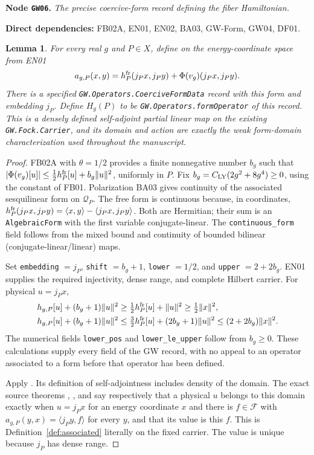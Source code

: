 \documentclass[11pt,a4paper]{article}
\newtheorem{lemma}[theorem]{Lemma}
\theoremstyle{remark}\newtheorem{remark}[theorem]{Remark}
\newcommand{\F}{\mathcal F}\newcommand{\Q}{\mathcal Q}\newcommand{\HH}{\mathcal H}
\newcommand{\node}[3]{\par\Needspace{6\baselineskip}\smallskip\hypertarget{node:#1}{}\label{nodepage:#1}\noindent\textbf{Node \texttt{#1}.} \textit{#2.}\par\noindent\textbf{Direct dependencies:} #3.\par}
\begin{document}
\node{GW06}{The precise coercive-form record defining the fiber Hamiltonian}{FB02A, EN01, EN02, BA03, GW-Form, GW04, DF01}
\begin{lemma}\label{lem:gwformrecord}
For every real $g$ and $P\in X$, define on the energy-coordinate space from EN01
\[
 a_{g,P}(x,y)=h_P^{\rm fr}(j_Px,j_Py)+\Phi(v_g)(j_Px,j_Py).
\]
There is a specified \texttt{GW.Operators.CoerciveFormData} record with this form and embedding $j_P$. Define $H_g(P)$ to be \texttt{GW.Operators.formOperator} of this record. This is a densely defined self-adjoint partial linear map on the existing \texttt{GW.Fock.Carrier}, and its domain and action are exactly the weak form-domain characterization used throughout the manuscript.
\end{lemma}
\begin{proof}
FB02A with $\theta=1/2$ provides a finite nonnegative number $b_g$ such that
$|\Phi(v_g)[u]|\leq\tfrac12h_P^{\rm fr}[u]+b_g\|u\|^2$, uniformly in $P$.
Fix $b_g=C_{\rm LY}(2g^2+8g^4)\geq0$, using the constant of FB01. Polarization BA03 gives continuity of the associated sesquilinear form on $\Q_P$. The free form is continuous because, in coordinates,
$h_P^{\rm fr}(j_Px,j_Py)=\langle x,y\rangle-\langle j_Px,j_Py\rangle$.
Both are Hermitian; their sum is an \texttt{AlgebraicForm} with the first variable conjugate-linear. The \texttt{continuous\_form} field follows from the mixed bound and continuity of bounded bilinear (conjugate-linear/linear) maps.

Set \texttt{embedding} $=j_P$, \texttt{shift} $=b_g+1$, \texttt{lower} $=1/2$, and \texttt{upper} $=2+2b_g$. EN01 supplies the required injectivity, dense range, and complete Hilbert carrier. For physical $u=j_Px$,
\begin{align*}
 h_{g,P}[u]+(b_g+1)\|u\|^2
 &\geq\tfrac12 h_P^{\rm fr}[u]+\|u\|^2\geq\tfrac12\|x\|^2,\\
 h_{g,P}[u]+(b_g+1)\|u\|^2
 &\leq\tfrac32 h_P^{\rm fr}[u]+(2b_g+1)\|u\|^2
 \leq(2+2b_g)\|x\|^2.
\end{align*}
The numerical fields \texttt{lower\_pos} and \texttt{lower\_le\_upper} follow from $b_g\geq0$. These calculations supply every field of the GW record, with no appeal to an operator associated to a form before that operator has been defined.

Apply . Its definition of self-adjointness includes density of the domain. The exact source theorems , , and  say respectively that a physical $u$ belongs to this domain exactly when $u=j_Px$ for an energy coordinate $x$ and there is $f\in\F$ with $a_{g,P}(y,x)=\langle j_Py,f\rangle$ for every $y$, and that its value is this $f$. This is Definition~\ref{def:associated} literally on the fixed carrier. The value is unique because $j_P$ has dense range.


\end{proof}
\end{document}
